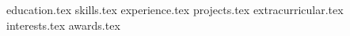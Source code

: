 \documentclass[11pt, a4paper]{awesome-cv}
\newcommand*{\sectiondir}{resume/}
\begin{document}
\makecvheader

{education.tex}
{skills.tex}
{experience.tex}
{projects.tex}
{extracurricular.tex}
{interests.tex}
{awards.tex}
\end{document}
